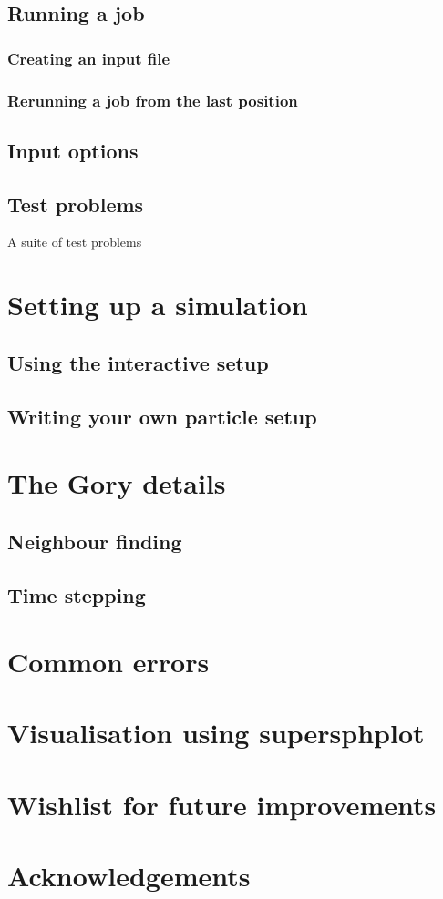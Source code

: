 \documentclass[a4paper,12pt]{article}
\begin{document}
\subsection{Running a job}
\subsubsection{Creating an input file}

\subsubsection{Rerunning a job from the last position}

\subsection{Input options}

\subsection{Test problems}
 A suite of test problems

\section{Setting up a simulation}

\subsection{Using the interactive setup}

\subsection{Writing your own particle setup}

\section{The Gory details}

\subsection{Neighbour finding}

\subsection{Time stepping}

\section{Common errors}

\section{Visualisation using supersphplot}

\section{Wishlist for future improvements}

\section*{Acknowledgements}
\end{document}
